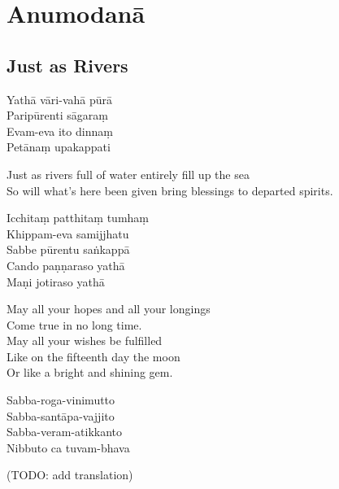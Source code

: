 \chapter{Anumodanā}

\section{Just as Rivers}


\begin{paritta}

%
Yathā vāri-vahā pūrā\\
Paripūrenti sāgaraṃ\\
Evam-eva ito dinnaṃ\\
Petānaṃ upakappati\hfill {}

\begin{english}
  Just as rivers full of water entirely fill up the sea\\
  So will what's here been given bring blessings to departed spirits.
\end{english}

Icchitaṃ patthitaṃ tumhaṃ\\
Khippam-eva samijjhatu\\
Sabbe pūrentu saṅkappā\\
Cando paṇṇaraso yathā\\
Maṇi jotiraso yathā\hfill {}

\begin{english}
  May all your hopes and all your longings\\
  Come true in no long time.\\
  May all your wishes be fulfilled\\
  Like on the fifteenth day the moon\\
  Or like a bright and shining gem.
\end{english}


%
Sabba-roga-vinimutto\\
Sabba-santāpa-vajjito\\
Sabba-veram-atikkanto\\
Nibbuto ca tuvam-bhava

\begin{english}
  (TODO: add translation)
\end{english}


\end{paritta}
